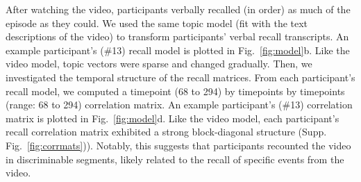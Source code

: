 \documentclass{article}
\begin{document}
{After watching the video, participants verbally recalled (in order) as much of the episode as they could.  We used the same topic model (fit with the text descriptions of the video) to transform participants' verbal recall transcripts. An example participant's (\#13) recall model is plotted in Fig.~\ref{fig:model}b. Like the video model, topic vectors were sparse and changed gradually.  Then, we investigated the temporal structure of the recall matrices. From each participant's recall model, we computed a timepoint (68 to 294) by timepoints by timepoints (range: 68 to 294) correlation matrix. An example participant's (\#13) correlation matrix is plotted in Fig.~\ref{fig:model}d. Like the video model, each participant's recall correlation matrix exhibited a strong block-diagonal structure (Supp. Fig.~\ref{fig:corrmats})). Notably, this suggests that participants recounted the video in discriminable segments, likely related to the recall of specific events from the video.


}
\end{document}
